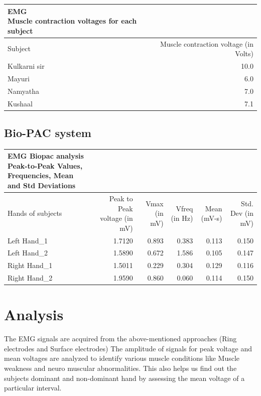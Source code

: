 \documentclass[
  11pt,
  letterpaper,
  DIV=11,
  numbers=noendperiod]{scrreprt}
\begin{document}
\begin{longtable*}{lr}
\caption*{
{\large EMG} \\ 
{\small Muscle contraction voltages for each subject}
} \\ 
\toprule
Subject & Muscle contraction voltage (in Volts) \\ 
\midrule\addlinespace[2.5pt]
Kulkarni sir & 10.0 \\ 
Mayuri & 6.0 \\ 
Namyatha & 7.0 \\ 
Kushaal & 7.1 \\ 
\bottomrule
\end{longtable*}

\subsection{Bio-PAC system}\label{bio-pac-system-2}

\begin{longtable*}{lrrrrr}
\caption*{
{\large EMG Biopac analysis} \\ 
{\small Peak-to-Peak Values, Frequencies, Mean and Std Deviations}
} \\ 
\toprule
Hands of subjects & Peak to Peak voltage (in mV) & Vmax (in mV) & Vfreq (in Hz) & Mean (mV-s) & Std. Dev (in mV) \\ 
\midrule\addlinespace[2.5pt]
Left Hand\_1 & 1.7120 & 0.893 & 0.383 & 0.113 & 0.150 \\ 
Left Hand\_2 & 1.5890 & 0.672 & 1.586 & 0.105 & 0.147 \\ 
Right Hand\_1 & 1.5011 & 0.229 & 0.304 & 0.129 & 0.116 \\ 
Right Hand\_2 & 1.9590 & 0.860 & 0.060 & 0.114 & 0.150 \\ 
\bottomrule
\end{longtable*}

\section{Analysis}\label{analysis-2}

The EMG signals are acquired from the above-mentioned approaches (Ring
electrodes and Surface electrodes) The amplitude of signals for peak
voltage and mean voltages are analyzed to identify various muscle
conditions like Muscle weakness and neuro muscular abnormalities. This
also helps us find out the subjects dominant and non-dominant hand by
assessing the mean voltage of a particular interval.
\end{document}
